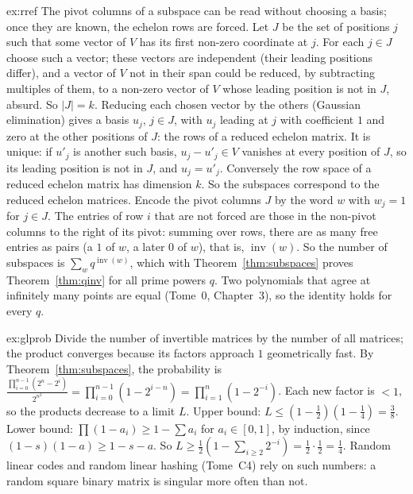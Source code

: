 \begin{solution}{ex:rref}
\idea The pivot columns of a subspace can be read without choosing a basis; once they are known, the echelon rows are forced.
\writeup Let $J$ be the set of positions $j$ such that some vector of $V$ has its first non-zero coordinate at $j$. For each $j\in J$ choose such a
vector; these vectors are independent (their leading positions differ), and a vector of $V$ not in their span could be reduced,
by subtracting multiples of them, to a non-zero vector of $V$ whose leading position is not in $J$, absurd. So $|J|=k$. Reducing
each chosen vector by the others (Gaussian elimination) gives a basis $u_j$, $j\in J$, with $u_j$ leading at $j$ with coefficient $1$ and zero
at the other positions of $J$: the rows of a reduced echelon matrix. It is unique: if $u'_j$ is another such basis, $u_j-u'_j\in V$ vanishes
at every position of $J$, so its leading position is not in $J$, and $u_j=u'_j$. Conversely the row space of a reduced echelon matrix has
dimension $k$. So the subspaces correspond to the reduced echelon matrices. Encode the pivot columns $J$ by the word $w$ with $w_j=1$ for
$j\in J$. The entries of row $i$ that are not forced are those in the non-pivot columns to the right of its pivot: summing over rows,
there are as many free entries as pairs (a $1$ of $w$, a later $0$ of $w$), that is, $\operatorname{inv}(w)$. So the number of subspaces is $\sum_wq^{\operatorname{inv}(w)}$, which with
Theorem~\ref{thm:subspaces} proves Theorem~\ref{thm:qinv} for all prime powers $q$. Two polynomials that agree at infinitely many
points are equal (Tome~0, Chapter~3), so the identity holds for every $q$.
\end{solution}

\begin{solution}{ex:glprob}
\idea Divide the number of invertible matrices by the number of all matrices; the product converges because its factors approach $1$
geometrically fast.
\writeup By Theorem~\ref{thm:subspaces}, the probability is $\frac{\prod_{i=0}^{n-1}(2^n-2^i)}{2^{n^2}}=\prod_{i=0}^{n-1}(1-2^{i-n})=\prod_{i=1}^n(1-2^{-i})$. Each new factor is $<1$, so the
products decrease to a limit $L$. Upper bound: $L\le(1-\frac12)(1-\frac14)=\frac38$. Lower bound: $\prod(1-a_i)\ge1-\sum a_i$ for $a_i\in[0,1]$, by induction, since
$(1-s)(1-a)\ge1-s-a$. So $L\ge\frac12(1-\sum_{i\ge2}2^{-i})=\frac12\cdot\frac12=\frac14$. Random linear codes and random linear hashing (Tome~C4) rely on such numbers:
a random square binary matrix is singular more often than not.
\end{solution}

